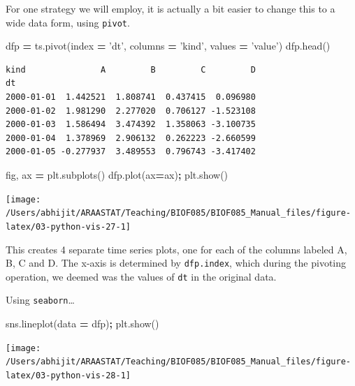 \documentclass[
  letterpaper,
]{scrbook}
\newenvironment{Shaded}{\begin{snugshade}}{\end{snugshade}}
\newcommand{\NormalTok}[1]{#1}
\newcommand{\OperatorTok}[1]{\textcolor[rgb]{0.81,0.36,0.00}{\textbf{#1}}}
\newcommand{\StringTok}[1]{\textcolor[rgb]{0.31,0.60,0.02}{#1}}
\begin{document}
For one strategy we will employ, it is actually a bit easier to change this to a wide data form, using \texttt{pivot}.

\begin{Shaded}
\begin{Highlighting}[]
\NormalTok{dfp }\OperatorTok{=}\NormalTok{ ts.pivot(index }\OperatorTok{=} \StringTok{'dt'}\NormalTok{, columns }\OperatorTok{=} \StringTok{'kind'}\NormalTok{, values }\OperatorTok{=} \StringTok{'value'}\NormalTok{)}
\NormalTok{dfp.head()}
\end{Highlighting}
\end{Shaded}

\begin{verbatim}
kind               A         B         C         D
dt                                                
2000-01-01  1.442521  1.808741  0.437415  0.096980
2000-01-02  1.981290  2.277020  0.706127 -1.523108
2000-01-03  1.586494  3.474392  1.358063 -3.100735
2000-01-04  1.378969  2.906132  0.262223 -2.660599
2000-01-05 -0.277937  3.489553  0.796743 -3.417402
\end{verbatim}

\begin{Shaded}
\begin{Highlighting}[]
\NormalTok{fig, ax }\OperatorTok{=}\NormalTok{ plt.subplots()}
\NormalTok{dfp.plot(ax}\OperatorTok{=}\NormalTok{ax)}\OperatorTok{;}
\NormalTok{plt.show()}
\end{Highlighting}
\end{Shaded}

\begin{center}\texttt{[image: /Users/abhijit/ARAASTAT/Teaching/BIOF085/BIOF085\_Manual\_files/figure-latex/03-python-vis-27-1]} \end{center}

This creates 4 separate time series plots, one for each of the columns labeled A, B, C and D. The x-axis is determined by \texttt{dfp.index}, which during the pivoting operation, we deemed was the values of \texttt{dt} in the original data.

Using \texttt{seaborn}\ldots{}

\begin{Shaded}
\begin{Highlighting}[]
\NormalTok{sns.lineplot(data }\OperatorTok{=}\NormalTok{ dfp)}\OperatorTok{;}
\NormalTok{plt.show()}
\end{Highlighting}
\end{Shaded}

\begin{center}\texttt{[image: /Users/abhijit/ARAASTAT/Teaching/BIOF085/BIOF085\_Manual\_files/figure-latex/03-python-vis-28-1]} \end{center}
\end{document}
